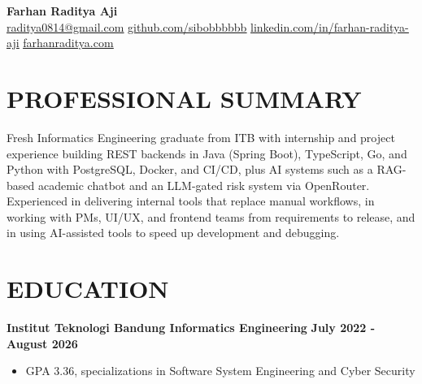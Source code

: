 \documentclass[10pt, a4paper]{article}
\begin{document}
\thispagestyle{empty} %

\begin{center}
    {\LARGE \textbf{Farhan Raditya Aji}} \\[4pt]
    \href{mailto:raditya0814@gmail.com}{\underline{raditya0814@gmail.com}} \textbar{} 
    \href{https://github.com/sibobbbbbb}{\underline{github.com/sibobbbbbb}} \textbar{} 
    \href{https://www.linkedin.com/in/farhan-raditya-aji}{\underline{linkedin.com/in/farhan-raditya-aji}} \textbar{} 
    \href{https://www.farhanraditya.com/}{\underline{farhanraditya.com}}
\end{center}

\section*{PROFESSIONAL SUMMARY}
\noindent
Fresh Informatics Engineering graduate from ITB with internship and project experience building REST backends in Java (Spring Boot), TypeScript, Go, and Python with PostgreSQL, Docker, and CI/CD, plus AI systems such as a RAG-based academic chatbot and an LLM-gated risk system via OpenRouter. Experienced in delivering internal tools that replace manual workflows, in working with PMs, UI/UX, and frontend teams from requirements to release, and in using AI-assisted tools to speed up development and debugging.

\section*{EDUCATION}
\noindent
\textbf{Institut Teknologi Bandung \textbar{} Informatics Engineering} \hfill \textbf{July 2022 - August 2026}
\begin{itemize}[leftmargin=0.25in, topsep=2pt, itemsep=0pt, parsep=2pt]
    \item GPA 3.36, specializations in Software System Engineering and Cyber Security
\end{itemize}

\end{document}
